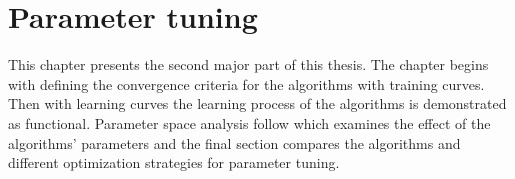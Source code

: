 
\chapter{Parameter tuning}\label{cha:param}

This chapter presents the second major part of this thesis. The chapter begins with defining the convergence criteria for the algorithms with training curves. Then with learning curves the learning process of the algorithms is demonstrated as functional. Parameter space analysis follow which examines the effect of the algorithms' parameters and the final section compares the algorithms and different optimization strategies for parameter tuning.


\newpage


\newpage


\newpage


\newpage

